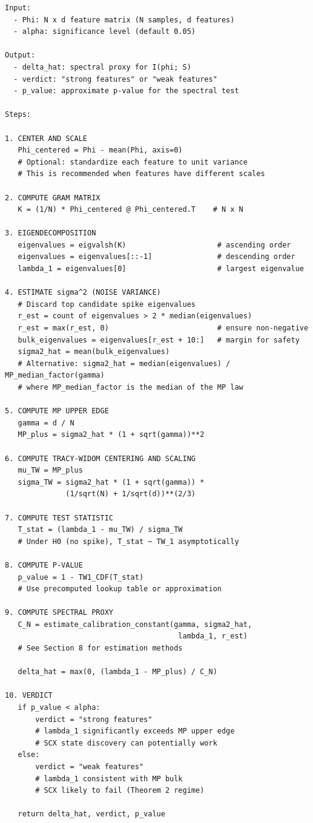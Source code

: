 \documentclass[
  12pt,
]{article}
\begin{document}
\begin{verbatim}
Input:
  - Phi: N x d feature matrix (N samples, d features)
  - alpha: significance level (default 0.05)

Output:
  - delta_hat: spectral proxy for I(phi; S)
  - verdict: "strong features" or "weak features"
  - p_value: approximate p-value for the spectral test

Steps:

1. CENTER AND SCALE
   Phi_centered = Phi - mean(Phi, axis=0)
   # Optional: standardize each feature to unit variance
   # This is recommended when features have different scales

2. COMPUTE GRAM MATRIX
   K = (1/N) * Phi_centered @ Phi_centered.T    # N x N

3. EIGENDECOMPOSITION
   eigenvalues = eigvalsh(K)                     # ascending order
   eigenvalues = eigenvalues[::-1]               # descending order
   lambda_1 = eigenvalues[0]                     # largest eigenvalue

4. ESTIMATE sigma^2 (NOISE VARIANCE)
   # Discard top candidate spike eigenvalues
   r_est = count of eigenvalues > 2 * median(eigenvalues)
   r_est = max(r_est, 0)                         # ensure non-negative
   bulk_eigenvalues = eigenvalues[r_est + 10:]   # margin for safety
   sigma2_hat = mean(bulk_eigenvalues)
   # Alternative: sigma2_hat = median(eigenvalues) / MP_median_factor(gamma)
   # where MP_median_factor is the median of the MP law
   
5. COMPUTE MP UPPER EDGE
   gamma = d / N
   MP_plus = sigma2_hat * (1 + sqrt(gamma))**2
   
6. COMPUTE TRACY-WIDOM CENTERING AND SCALING
   mu_TW = MP_plus
   sigma_TW = sigma2_hat * (1 + sqrt(gamma)) *
              (1/sqrt(N) + 1/sqrt(d))**(2/3)

7. COMPUTE TEST STATISTIC
   T_stat = (lambda_1 - mu_TW) / sigma_TW
   # Under H0 (no spike), T_stat ~ TW_1 asymptotically

8. COMPUTE P-VALUE
   p_value = 1 - TW1_CDF(T_stat)
   # Use precomputed lookup table or approximation

9. COMPUTE SPECTRAL PROXY
   C_N = estimate_calibration_constant(gamma, sigma2_hat,
                                        lambda_1, r_est)
   # See Section 8 for estimation methods
   
   delta_hat = max(0, (lambda_1 - MP_plus) / C_N)

10. VERDICT
   if p_value < alpha:
       verdict = "strong features"
       # lambda_1 significantly exceeds MP upper edge
       # SCX state discovery can potentially work
   else:
       verdict = "weak features"
       # lambda_1 consistent with MP bulk
       # SCX likely to fail (Theorem 2 regime)
   
   return delta_hat, verdict, p_value
\end{verbatim}
\end{document}
